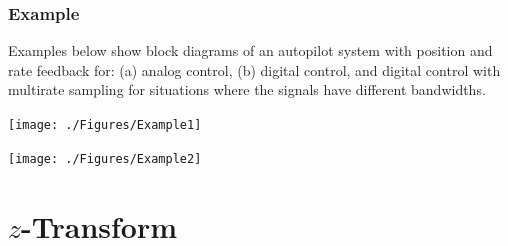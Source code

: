 \documentclass[mathserif, 10pt]{beamer} %
\begin{document}
\frame
{

\normalsize

\frametitle{Example}

\scriptsize Examples below show block diagrams of an autopilot system with position and rate feedback for: (a) analog control, (b) digital control,
and digital control with multirate sampling for situations where the signals have different bandwidths.

\begin{center}
\texttt{[image: ./Figures/Example1]}
\end{center}
\vspace{-0.5in}
\begin{center}
\texttt{[image: ./Figures/Example2]}
\end{center}


}


\section{$z$-Transform}
\end{document}
